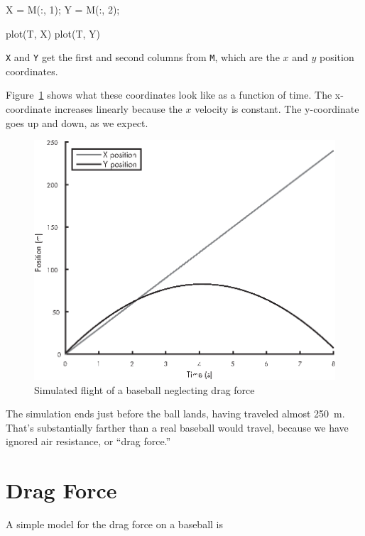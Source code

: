 \begin{code}
    X = M(:, 1);
    Y = M(:, 2);
    
    plot(T, X)
    plot(T, Y)
\end{code}

\lstinline{X} and \lstinline{Y} get the first and second columns from \lstinline{M}, which are the $x$ and $y$ position coordinates.


Figure~\ref{fig:baseball1} shows what these coordinates look like as a function of time.  The x-coordinate increases linearly because the $x$ velocity is constant.  The y-coordinate goes up and down, as we expect.

\begin{figure}[h]
\includegraphics{images/figure12_02_new.eps}
\caption{Simulated flight of a baseball neglecting drag force}
\label{fig:baseball1}
\end{figure}

The simulation ends just before the ball lands, having traveled almost \SI{250}{\meter}.  That's substantially farther than a real baseball would travel, because we have ignored air resistance, or ``drag force.''


\section{Drag Force}
\label{drag}


A simple model for the drag force on a baseball is

